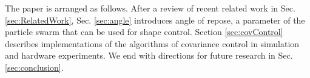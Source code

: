 The paper is arranged as follows. 
After a review of recent related work in Sec.  \ref{sec:RelatedWork},
  Sec.  \ref{sec:angle} introduces angle of repose, a parameter of the particle swarm that can be used for shape control. 
Section  \ref{sec:covControl} describes implementations of the algorithms of covariance control in simulation and hardware experiments. 
 We end with directions for future research in Sec.  \ref{sec:conclusion}.



